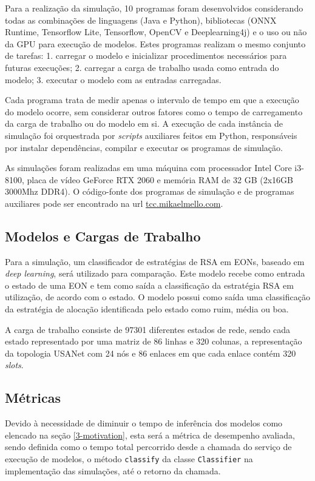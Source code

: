 Para a realização da simulação, 10 programas foram desenvolvidos considerando todas as combinações de linguagens (Java e Python), bibliotecas (ONNX Runtime, Tensorflow Lite, Tensorflow, OpenCV e Deeplearning4j) e o uso ou não da GPU para execução de modelos. Estes programas realizam o mesmo conjunto de tarefas: 1. carregar o modelo e inicializar procedimentos necessários para futuras execuções; 2. carregar a carga de trabalho usada como entrada do modelo; 3. executar o modelo com as entradas carregadas.

Cada programa trata de medir apenas o intervalo de tempo em que a execução do modelo ocorre, sem considerar outros fatores como o tempo de carregamento da carga de trabalho ou do modelo em si. A execução de cada instância de simulação foi orquestrada por \textit{scripts} auxiliares feitos em Python, responsáveis por instalar dependências, compilar e executar os programas de simulação.

As simulações foram realizadas em uma máquina com processador Intel Core i3-8100, placa de vídeo GeForce RTX 2060 e memória RAM de 32 GB (2x16GB 3000Mhz DDR4). O código-fonte dos programas de simulação e de programas auxiliares pode ser encontrado na url \url{tcc.mikaelmello.com}.

\subsection{Modelos e Cargas de Trabalho}

Para a simulação, um classificador de estratégias de RSA em EONs, baseado em \textit{deep learning}, será utilizado para comparação. Este modelo recebe como entrada o estado de uma EON e tem como saída a classificação da estratégia RSA em utilização, de acordo com o estado. O modelo possui como saída uma classificação da estratégia de alocação identificada pelo estado como ruim, média ou boa.

A carga de trabalho consiste de 97301 diferentes estados de rede, sendo cada estado representado por uma matriz de 86 linhas e 320 colunas, a representação da topologia USANet com 24 nós e 86 enlaces em que cada enlace contém 320 \textit{slots}.

\subsection{Métricas}

Devido à necessidade de diminuir o tempo de inferência dos modelos como elencado na seção \ref{3-motivation}, esta será a métrica de desempenho avaliada, sendo definida como o tempo total percorrido desde a chamada do serviço de execução de modelos, o método \texttt{classify} da classe \texttt{Classifier} na implementação das simulações, até o retorno da chamada.

